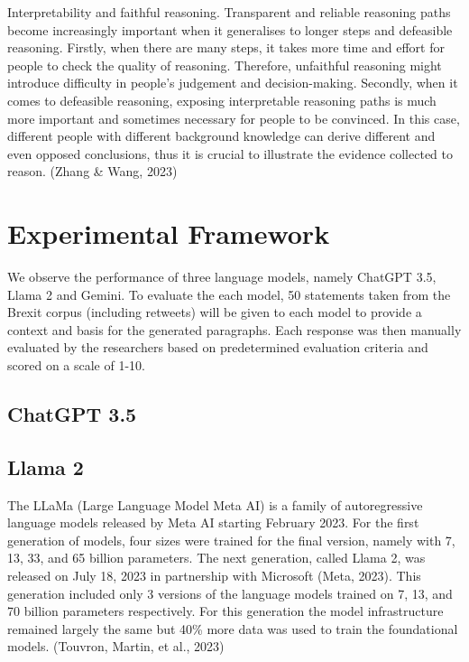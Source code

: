 \documentclass[fleqn,moreauthors,10pt]{ds_report}
\begin{document}
Interpretability and faithful reasoning. Transparent and reliable reasoning paths become increasingly important when it generalises to longer steps and defeasible reasoning. Firstly, when there are many steps, it takes more time and effort for people to check the quality of reasoning. Therefore, unfaithful reasoning might introduce difficulty in people’s judgement and decision-making. Secondly, when it comes to defeasible reasoning, exposing interpretable reasoning paths is much more important and sometimes necessary for people to be convinced. In this case, different people with different background knowledge can derive different and even opposed conclusions, thus it is crucial to illustrate the evidence collected to reason. (Zhang \& Wang, 2023)

\section*{Experimental Framework}

We observe the performance of three language models, namely ChatGPT 3.5, Llama 2 and Gemini. To evaluate the each model, 50 statements taken from the Brexit corpus (including retweets) will be given to each model to provide a context and basis for the generated paragraphs. Each response was then manually evaluated by the researchers based on predetermined evaluation criteria and scored on a scale of 1-10.

\subsection*{ChatGPT 3.5}

\subsection*{Llama 2}

The LLaMa (Large Language Model Meta AI) is a family of autoregressive language models released by Meta AI starting February 2023. For the first generation of models, four sizes were trained for the final version, namely with 7, 13, 33, and 65 billion parameters. The next generation, called Llama 2, was released on July 18, 2023 in partnership with Microsoft (Meta, 2023). This generation included only 3 versions of the language models trained on 7, 13, and 70 billion parameters respectively. For this generation the model infrastructure remained largely the same but 40\% more data was used to train the foundational models.  (Touvron, Martin, et al., 2023)
\end{document}
